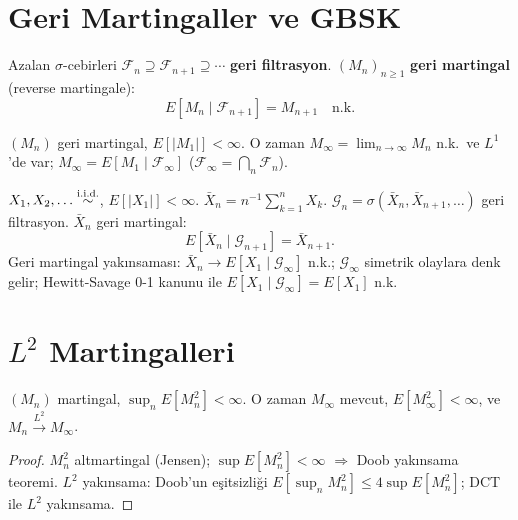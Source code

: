 \section{Geri Martingaller ve GBSK}
\label{sec:geri_martingal}

\begin{tanim}
\label{def:geri_martingal}
Azalan $\sigma$-cebirleri $\mathcal{F}_n\supseteq\mathcal{F}_{n+1}\supseteq\cdots$ \textbf{geri filtrasyon}. $(M_n)_{n\geq1}$ \textbf{geri martingal} (reverse martingale):
\[
  E[M_n\mid\mathcal{F}_{n+1}] = M_{n+1} \quad \text{n.k.}
\]
\end{tanim}

\begin{teorem}
\label{thm:geri_yaklinsama}
$(M_n)$ geri martingal, $E[|M_1|]<\infty$. O zaman $M_\infty = \lim_{n\to\infty}M_n$ n.k.\ ve $L^1$'de var; $M_\infty = E[M_1\mid\mathcal{F}_\infty]$ ($\mathcal{F}_\infty = \bigcap_n\mathcal{F}_n$).
\end{teorem}

\begin{teorem}
\label{thm:gbsk_geri}
$X_1,X_2,\ldots\overset{\text{i.i.d.}}{\sim}$, $E[|X_1|]<\infty$. $\bar{X}_n = n^{-1}\sum_{k=1}^n X_k$.
$\mathcal{G}_n = \sigma(\bar{X}_n, \bar{X}_{n+1}, \ldots)$ geri filtrasyon. $\bar{X}_n$ geri martingal:
\[
  E[\bar{X}_n\mid\mathcal{G}_{n+1}] = \bar{X}_{n+1}.
\]
Geri martingal yakınsaması: $\bar{X}_n\to E[X_1\mid\mathcal{G}_\infty]$ n.k.; $\mathcal{G}_\infty$ simetrik olaylara denk gelir; Hewitt-Savage 0-1 kanunu ile $E[X_1\mid\mathcal{G}_\infty]=E[X_1]$ n.k.
\end{teorem}

\section{$L^2$ Martingalleri}
\label{sec:l2_martingal}

\begin{teorem}
\label{thm:l2_martingal}
$(M_n)$ martingal, $\sup_n E[M_n^2] < \infty$. O zaman
$M_\infty$ mevcut, $E[M_\infty^2] < \infty$, ve $M_n \xrightarrow{L^2} M_\infty$.
\end{teorem}

\begin{proof}
$M_n^2$ altmartingal (Jensen); $\sup E[M_n^2] < \infty$ $\Rightarrow$ Doob yakınsama teoremi.
$L^2$ yakınsama: Doob'un eşitsizliği $E[\sup_n M_n^2] \leq 4\sup E[M_n^2]$;
DCT ile $L^2$ yakınsama.
\end{proof}

